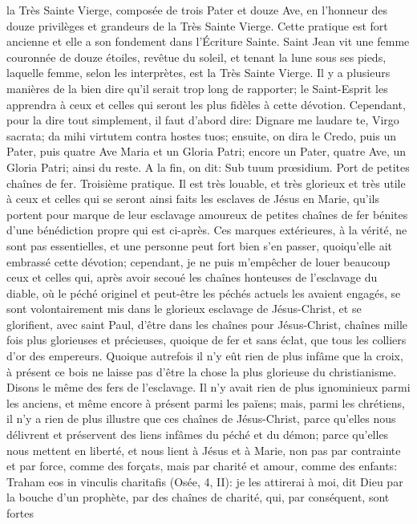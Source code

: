 la Très Sainte Vierge, composée de trois Pater et douze Ave, en l'honneur des douze privilèges et grandeurs de la
Très Sainte Vierge. Cette pratique est fort ancienne et elle a son fondement dans l'Écriture Sainte. Saint Jean vit
une femme couronnée de douze étoiles, revêtue du soleil, et tenant la lune sous ses pieds, laquelle femme, selon
les interprètes, est la Très Sainte Vierge.
 Il y a plusieurs manières de la bien dire qu'il serait trop long de rapporter; le Saint-Esprit les apprendra à ceux
et celles qui seront les plus fidèles à cette dévotion. Cependant, pour la dire tout simplement, il faut d'abord dire:
Dignare me laudare te, Virgo sacrata; da mihi virtutem contra hostes tuos; ensuite, on dira le Credo, puis un Pater,
puis quatre Ave Maria et un Gloria Patri; encore un Pater, quatre Ave, un Gloria Patri; ainsi du reste. A la fin, on dit:
Sub tuum prœsidium.
Port de petites chaînes de fer.
 Troisième pratique. Il est très louable, et très glorieux et très utile à ceux et celles qui se seront ainsi faits les
esclaves de Jésus en Marie, qu'ils portent pour marque de leur esclavage amoureux de petites chaînes de fer
bénites d'une bénédiction propre qui est ci-après.
Ces marques extérieures, à la vérité, ne sont pas essentielles, et une personne peut fort bien s'en passer,
quoiqu'elle ait embrassé cette dévotion; cependant, je ne puis m'empêcher de louer beaucoup ceux et celles qui,
après avoir secoué les chaînes honteuses de l'esclavage du diable, où le péché originel et peut-être les péchés
actuels les avaient engagés, se sont volontairement mis dans le glorieux esclavage de Jésus-Christ, et se
glorifient, avec saint Paul, d'être dans les chaînes pour Jésus-Christ, chaînes mille fois plus glorieuses et
précieuses, quoique de fer et sans éclat, que tous les colliers d'or des empereurs.
 Quoique autrefois il n'y eût rien de plus infâme que la croix, à présent ce bois ne laisse pas d'être la chose la
plus glorieuse du christianisme. Disons le même des fers de l'esclavage. Il n'y avait rien de plus ignominieux parmi
les anciens, et même encore à présent parmi les païens; mais, parmi les chrétiens, il n'y a rien de plus illustre que
ces chaînes de Jésus-Christ, parce qu'elles nous délivrent et préservent des liens infâmes du péché et du démon;
parce qu'elles nous mettent en liberté, et nous lient à Jésus et à Marie, non pas par contrainte et par force, comme
des forçats, mais par charité et amour, comme des enfants: Traham eos in vinculis charitafis (Osée, 4, II): je les
attirerai à moi, dit Dieu par la bouche d'un prophète, par des chaînes de charité, qui, par conséquent, sont fortes
